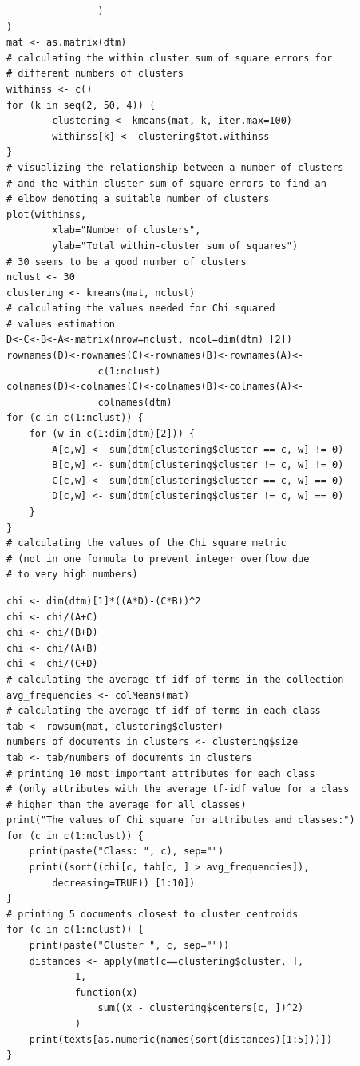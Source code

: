 \begin{verbatim}
                )
)
mat <- as.matrix(dtm)
# calculating the within cluster sum of square errors for
# different numbers of clusters
withinss <- c()
for (k in seq(2, 50, 4)) {
        clustering <- kmeans(mat, k, iter.max=100)
        withinss[k] <- clustering$tot.withinss
}
# visualizing the relationship between a number of clusters
# and the within cluster sum of square errors to find an
# elbow denoting a suitable number of clusters
plot(withinss,
        xlab="Number of clusters",
        ylab="Total within-cluster sum of squares")
# 30 seems to be a good number of clusters
nclust <- 30
clustering <- kmeans(mat, nclust)
# calculating the values needed for Chi squared
# values estimation
D<-C<-B<-A<-matrix(nrow=nclust, ncol=dim(dtm) [2])
rownames(D)<-rownames(C)<-rownames(B)<-rownames(A)<-
                c(1:nclust)
colnames(D)<-colnames(C)<-colnames(B)<-colnames(A)<-
                colnames(dtm)
for (c in c(1:nclust)) {
    for (w in c(1:dim(dtm)[2])) {
        A[c,w] <- sum(dtm[clustering$cluster == c, w] != 0)
        B[c,w] <- sum(dtm[clustering$cluster != c, w] != 0)
        C[c,w] <- sum(dtm[clustering$cluster == c, w] == 0)
        D[c,w] <- sum(dtm[clustering$cluster != c, w] == 0)
    }
}
# calculating the values of the Chi square metric
# (not in one formula to prevent integer overflow due
# to very high numbers)
\end{verbatim}

\begin{verbatim}
chi <- dim(dtm)[1]*((A*D)-(C*B))^2
chi <- chi/(A+C)
chi <- chi/(B+D)
chi <- chi/(A+B)
chi <- chi/(C+D)
# calculating the average tf-idf of terms in the collection
avg_frequencies <- colMeans(mat)
# calculating the average tf-idf of terms in each class
tab <- rowsum(mat, clustering$cluster)
numbers_of_documents_in_clusters <- clustering$size
tab <- tab/numbers_of_documents_in_clusters
# printing 10 most important attributes for each class
# (only attributes with the average tf-idf value for a class
# higher than the average for all classes)
print("The values of Chi square for attributes and classes:")
for (c in c(1:nclust)) {
    print(paste("Class: ", c), sep="")
    print((sort((chi[c, tab[c, ] > avg_frequencies]),
        decreasing=TRUE)) [1:10])
}
# printing 5 documents closest to cluster centroids
for (c in c(1:nclust)) {
    print(paste("Cluster ", c, sep=""))
    distances <- apply(mat[c==clustering$cluster, ],
            1,
            function(x)
                sum((x - clustering$centers[c, ])^2)
            )
    print(texts[as.numeric(names(sort(distances)[1:5]))])
}
\end{verbatim}


